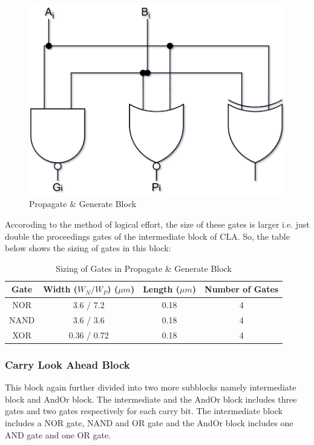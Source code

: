 \documentclass[conference]{IEEEtran}
\begin{document}
\begin{figure}[H]
    \centering
    \includegraphics[width=0.5\linewidth]{propgencir.png}
    \caption{Propagate \& Generate Block}
    \label{fig:propagate_generate}
\end{figure}

Accoroding to the method of logical effort, the size of these gates is larger i.e. just double the proceedings gates of the intermediate block of CLA. So, the table below shows the sizing of gates in this block:

\begin{table}[H]
\centering
\caption{Sizing of Gates in Propagate \& Generate Block}
\begin{tabular}{|c|c|c|c|}
\hline
\rowcolor{cyan!10}
\textbf{Gate} & \textbf{Width ($W_N / W_P$) ($\mu m$)} & \textbf{Length ($\mu m$)} & \textbf{Number of Gates} \\ \hline
NOR          & 3.6 / 7.2                 & 0.18                  & 4                        \\ \hline
NAND         & 3.6 / 3.6                 & 0.18                  & 4                        \\ \hline
XOR          & 0.36 / 0.72               & 0.18                  & 4                        \\ \hline
\end{tabular}
\label{tab:propagate_generate}
\end{table} 

\subsubsection{Carry Look Ahead Block}
This block again further divided into two more subblocks namely intermediate block and AndOr block. The intermediate and the AndOr block includes three gates and two gates respectively for each carry bit. The intermediate block includes a NOR gate, NAND and OR gate and the AndOr block includes one AND gate and one OR gate.
\end{document}
